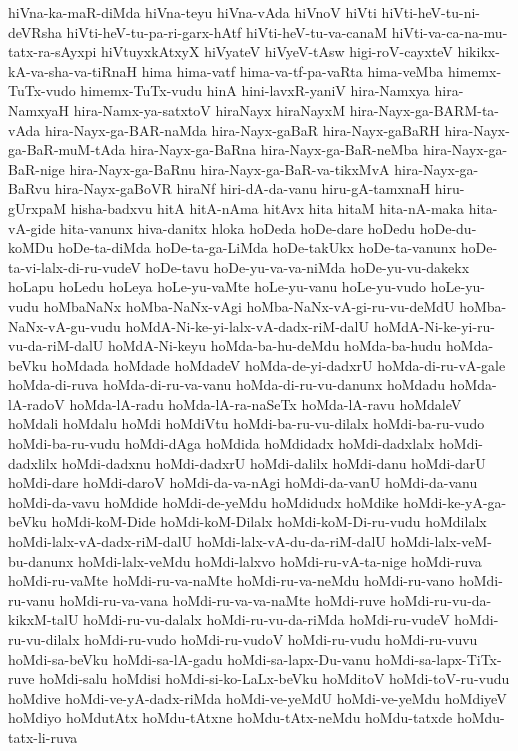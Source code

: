 {hiVna-ka-maR-diMda
hiVna-teyu
hiVna-vAda
hiVnoV
hiVti
hiVti-heV-tu-ni-deVRsha
hiVti-heV-tu-pa-ri-garx-hAtf
hiVti-heV-tu-va-canaM
hiVti-va-ca-na-mu-tatx-ra-sAyxpi
hiVtuyxkAtxyX
hiVyateV
hiVyeV-tAsw
higi-roV-cayxteV
hikikx-kA-va-sha-va-tiRnaH
hima
hima-vatf
hima-va-tf-pa-vaRta
hima-veMba
himemx-TuTx-vudo
himemx-TuTx-vudu
hinA
hini-lavxR-yaniV
hira-Namxya
hira-NamxyaH
hira-Namx-ya-satxtoV
hiraNayx
hiraNayxM
hira-Nayx-ga-BARM-ta-vAda
hira-Nayx-ga-BAR-naMda
hira-Nayx-gaBaR
hira-Nayx-gaBaRH
hira-Nayx-ga-BaR-muM-tAda
hira-Nayx-ga-BaRna
hira-Nayx-ga-BaR-neMba
hira-Nayx-ga-BaR-nige
hira-Nayx-ga-BaRnu
hira-Nayx-ga-BaR-va-tikxMvA
hira-Nayx-ga-BaRvu
hira-Nayx-gaBoVR
hiraNf
hiri-dA-da-vanu
hiru-gA-tamxnaH
hiru-gUrxpaM
hisha-badxvu
hitA
hitA-nAma
hitAvx
hita
hitaM
hita-nA-maka
hita-vA-gide
hita-vanunx
hiva-danitx
hloka
hoDeda
hoDe-dare
hoDedu
hoDe-du-koMDu
hoDe-ta-diMda
hoDe-ta-ga-LiMda
hoDe-takUkx
hoDe-ta-vanunx
hoDe-ta-vi-lalx-di-ru-vudeV
hoDe-tavu
hoDe-yu-va-va-niMda
hoDe-yu-vu-dakekx
hoLapu
hoLedu
hoLeya
hoLe-yu-vaMte
hoLe-yu-vanu
hoLe-yu-vudo
hoLe-yu-vudu
hoMbaNaNx
hoMba-NaNx-vAgi
hoMba-NaNx-vA-gi-ru-vu-deMdU
hoMba-NaNx-vA-gu-vudu
hoMdA-Ni-ke-yi-lalx-vA-dadx-riM-dalU
hoMdA-Ni-ke-yi-ru-vu-da-riM-dalU
hoMdA-Ni-keyu
hoMda-ba-hu-deMdu
hoMda-ba-hudu
hoMda-beVku
hoMdada
hoMdade
hoMdadeV
hoMda-de-yi-dadxrU
hoMda-di-ru-vA-gale
hoMda-di-ruva
hoMda-di-ru-va-vanu
hoMda-di-ru-vu-danunx
hoMdadu
hoMda-lA-radoV
hoMda-lA-radu
hoMda-lA-ra-naSeTx
hoMda-lA-ravu
hoMdaleV
hoMdali
hoMdalu
hoMdi
hoMdiVtu
hoMdi-ba-ru-vu-dilalx
hoMdi-ba-ru-vudo
hoMdi-ba-ru-vudu
hoMdi-dAga
hoMdida
hoMdidadx
hoMdi-dadxlalx
hoMdi-dadxlilx
hoMdi-dadxnu
hoMdi-dadxrU
hoMdi-dalilx
hoMdi-danu
hoMdi-darU
hoMdi-dare
hoMdi-daroV
hoMdi-da-va-nAgi
hoMdi-da-vanU
hoMdi-da-vanu
hoMdi-da-vavu
hoMdide
hoMdi-de-yeMdu
hoMdidudx
hoMdike
hoMdi-ke-yA-ga-beVku
hoMdi-koM-Dide
hoMdi-koM-Dilalx
hoMdi-koM-Di-ru-vudu
hoMdilalx
hoMdi-lalx-vA-dadx-riM-dalU
hoMdi-lalx-vA-du-da-riM-dalU
hoMdi-lalx-veM-bu-danunx
hoMdi-lalx-veMdu
hoMdi-lalxvo
hoMdi-ru-vA-ta-nige
hoMdi-ruva
hoMdi-ru-vaMte
hoMdi-ru-va-naMte
hoMdi-ru-va-neMdu
hoMdi-ru-vano
hoMdi-ru-vanu
hoMdi-ru-va-vana
hoMdi-ru-va-va-naMte
hoMdi-ruve
hoMdi-ru-vu-da-kikxM-talU
hoMdi-ru-vu-dalalx
hoMdi-ru-vu-da-riMda
hoMdi-ru-vudeV
hoMdi-ru-vu-dilalx
hoMdi-ru-vudo
hoMdi-ru-vudoV
hoMdi-ru-vudu
hoMdi-ru-vuvu
hoMdi-sa-beVku
hoMdi-sa-lA-gadu
hoMdi-sa-lapx-Du-vanu
hoMdi-sa-lapx-TiTx-ruve
hoMdi-salu
hoMdisi
hoMdi-si-ko-LaLx-beVku
hoMditoV
hoMdi-toV-ru-vudu
hoMdive
hoMdi-ve-yA-dadx-riMda
hoMdi-ve-yeMdU
hoMdi-ve-yeMdu
hoMdiyeV
hoMdiyo
hoMdutAtx
hoMdu-tAtxne
hoMdu-tAtx-neMdu
hoMdu-tatxde
hoMdu-tatx-li-ruva
}
